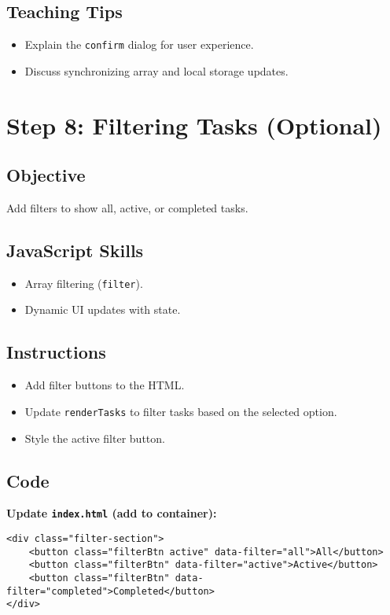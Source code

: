 \documentclass[a4paper,12pt]{article}
\begin{document}
\subsection{Teaching Tips}
\begin{itemize}
    \item Explain the \texttt{confirm} dialog for user experience.
    \item Discuss synchronizing array and local storage updates.
\end{itemize}

\section{Step 8: Filtering Tasks (Optional)}
\subsection{Objective}
Add filters to show all, active, or completed tasks.

\subsection{JavaScript Skills}
\begin{itemize}
    \item Array filtering (\texttt{filter}).
    \item Dynamic UI updates with state.
\end{itemize}

\subsection{Instructions}
\begin{itemize}
    \item Add filter buttons to the HTML.
    \item Update \texttt{renderTasks} to filter tasks based on the selected option.
    \item Style the active filter button.
\end{itemize}

\subsection{Code}
\textbf{Update \texttt{index.html} (add to container):}
\lstset{language=HTML}
\begin{lstlisting}
<div class="filter-section">
    <button class="filterBtn active" data-filter="all">All</button>
    <button class="filterBtn" data-filter="active">Active</button>
    <button class="filterBtn" data-filter="completed">Completed</button>
</div>
\end{lstlisting}
\end{document}
